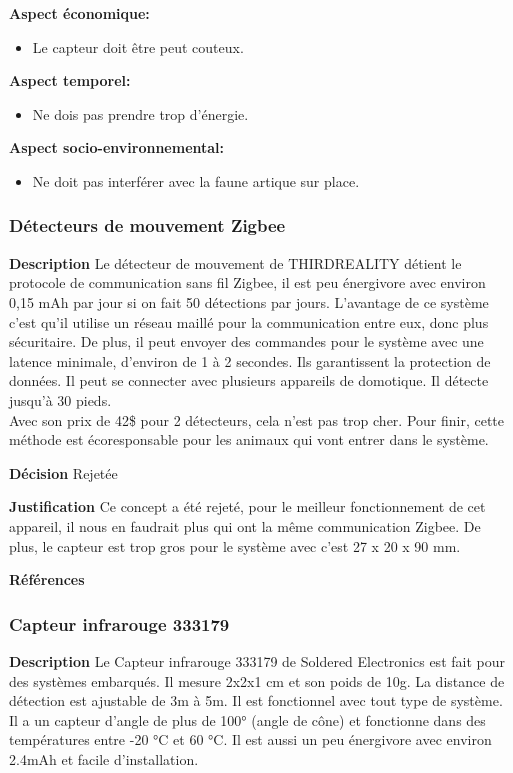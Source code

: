 \noindent\textbf{Aspect économique:}
\begin{itemize}
    \item Le capteur doit être peut couteux.
\end{itemize}

\noindent\textbf{Aspect temporel:}
\begin{itemize}
    \item Ne dois pas prendre trop d’énergie.
\end{itemize}

\noindent\textbf{Aspect socio-environnemental:}
\begin{itemize}
    \item Ne doit pas interférer avec la faune artique sur place.
\end{itemize}


\subsubsection{Détecteurs de mouvement Zigbee}
\noindent\textbf{Description} Le détecteur de mouvement de THIRDREALITY détient le protocole de communication sans fil Zigbee, il est peu énergivore avec environ 0,15 mAh par jour si on fait 50 détections par jours. L’avantage de ce système c’est qu’il utilise un réseau maillé pour la communication entre eux, donc plus sécuritaire. De plus, il peut envoyer des commandes pour le système avec une latence minimale, d’environ de 1 à 2 secondes. Ils garantissent la protection de données. Il peut se connecter avec plusieurs appareils de domotique. Il détecte jusqu’à 30 pieds. 
\\

Avec son prix de 42\$ pour 2 détecteurs, cela n’est pas trop cher. Pour finir, cette méthode est écoresponsable pour les animaux qui vont entrer dans le système.
\smallskip

\noindent\textbf{Décision} Rejetée
\smallskip

\noindent\textbf{Justification} Ce concept a été rejeté, pour le meilleur fonctionnement de cet appareil, il nous en faudrait plus qui ont la même communication Zigbee. De plus, le capteur est trop gros pour le système avec c’est 27 x 20 x 90 mm.  
\smallskip


\noindent\textbf{Références}
\cite{Zigbee1}

\subsubsection{Capteur infrarouge 333179}
\label{sec:capte}
\noindent\textbf{Description} Le Capteur infrarouge 333179 de Soldered Electronics est fait pour des systèmes embarqués. Il mesure 2x2x1 cm et son poids de 10g.  La distance de détection est ajustable de 3m à 5m. Il est fonctionnel avec tout type de système. Il a un capteur d’angle de plus de 100° (angle de cône) et fonctionne dans des températures entre -20 °C et 60 °C. Il est aussi un peu énergivore avec environ 2.4mAh et facile d’installation. 
\\

